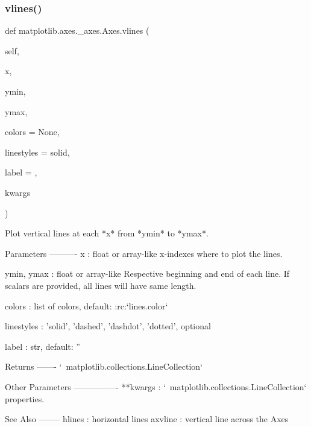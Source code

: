 \begin{DoxyVerb}
\subsubsection{\texorpdfstring{vlines()}{vlines()}}
{\footnotesize\ttfamily def matplotlib.\+axes.\+\_\+axes.\+Axes.\+vlines (\begin{DoxyParamCaption}\item[{}]{self,  }\item[{}]{x,  }\item[{}]{ymin,  }\item[{}]{ymax,  }\item[{}]{colors = {\ttfamily None},  }\item[{}]{linestyles = {\ttfamily \textquotesingle{}solid\textquotesingle{}},  }\item[{}]{label = {\ttfamily \textquotesingle{}\textquotesingle{}},  }\item[{}]{kwargs }\end{DoxyParamCaption})}

\begin{DoxyVerb}Plot vertical lines at each *x* from *ymin* to *ymax*.

Parameters
----------
x : float or array-like
    x-indexes where to plot the lines.

ymin, ymax : float or array-like
    Respective beginning and end of each line. If scalars are
    provided, all lines will have same length.

colors : list of colors, default: :rc:`lines.color`

linestyles : {'solid', 'dashed', 'dashdot', 'dotted'}, optional

label : str, default: ''

Returns
-------
`~matplotlib.collections.LineCollection`

Other Parameters
----------------
**kwargs : `~matplotlib.collections.LineCollection` properties.

See Also
--------
hlines : horizontal lines
axvline : vertical line across the Axes
\end{DoxyVerb}
 \mbox{\label{classmatplotlib_1_1axes_1_1__axes_1_1Axes_a7042d434b13660321d26592b002976ee}} 

\end{DoxyVerb}
